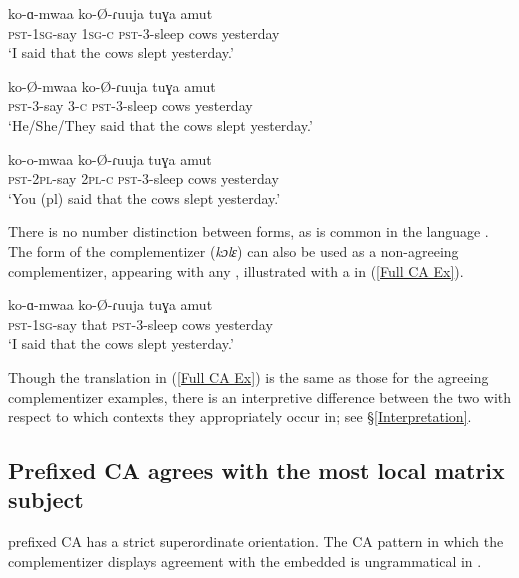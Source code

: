 \documentclass[output=paper,newtxmath,modfonts,nonflat,hidelinks]{langsci/langscibook}
\begin{document}
\ea \label{Agreeing C Paradigm}
\begin{xlist} 

\ex
\gll	ko-ɑ-mwaa  ko-\O-ɾuuja tuɣa amut \\
\textsc{pst}-1\textsc{sg}-say 1\textsc{sg-c} \textsc{pst}-3-sleep cows yesterday \\
\glt `I said that the cows slept yesterday.'

\ex  \label{Agreeing 3rd}
\gll ko-\O-mwaa  ko-\O-ɾuuja tuɣa amut \\
\textsc{pst}-3-say 3-\textsc{c} \textsc{pst}-3-sleep cows yesterday \\
\glt `He/She/They said that the cows slept yesterday.'
    	
\ex
\gll ko-o-mwaa  ko-\O-ɾuuja tuɣa amut \\
\textsc{pst}-2\textsc{pl}-say 2\textsc{pl-c} \textsc{pst}-3-sleep cows yesterday \\
\glt `You (pl) said that the cows slept yesterday.'

\end{xlist}
\z

\noindent There is no number distinction between  forms, as is common in the language \citep[see][]{Jake:1979, Toweett:1979}. The  form of the complementizer (\textit{kɔlɛ}) can also be used as a non-agreeing complementizer, appearing with any , illustrated with a   in (\ref{Full CA Ex}). 

\ea \label{Full CA Ex}
\gll	ko-ɑ-mwaa  ko-\O-ɾuuja tuɣa amut \\
\textsc{pst}-1\textsc{sg}-say that \textsc{pst}-3-sleep cows yesterday \\
\glt `I said that the cows slept yesterday.'

\z

\noindent Though the translation in (\ref{Full CA Ex}) is the same as those for the agreeing complementizer examples, there is an interpretive difference between the two with respect to which contexts they appropriately occur in; see \S \ref{Interpretation}.

\subsection{Prefixed CA agrees with the most local matrix subject} 

 prefixed CA has a strict superordinate  orientation. The  CA pattern \textendash in which the complementizer displays agreement with the embedded  \textendash is ungrammatical in . 
\end{document}
